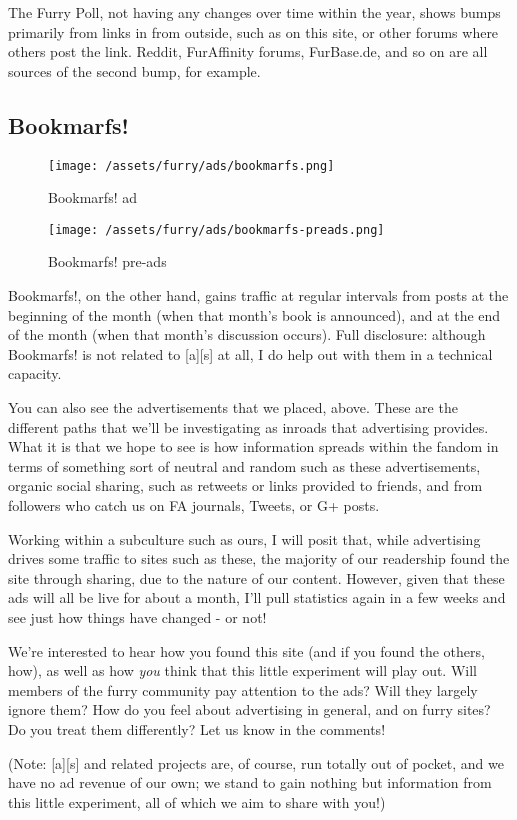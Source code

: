 The Furry Poll, not having any changes over time within the year, shows
bumps primarily from links in from outside, such as on this site, or
other forums where others post the link. Reddit, FurAffinity forums,
FurBase.de, and so on are all sources of the second bump, for example.

\subsection{Bookmarfs!}\label{bookmarfs}

\begin{figure}[htbp]
\centering
\texttt{[image: /assets/furry/ads/bookmarfs.png]}
\caption{Bookmarfs! ad}
\end{figure}

\begin{figure}[htbp]
\centering
\texttt{[image: /assets/furry/ads/bookmarfs-preads.png]}
\caption{Bookmarfs! pre-ads}
\end{figure}

Bookmarfs!, on the other hand, gains traffic at regular intervals from
posts at the beginning of the month (when that month's book is
announced), and at the end of the month (when that month's discussion
occurs). Full disclosure: although Bookmarfs! is not related to
{[}a{]}{[}s{]} at all, I do help out with them in a technical capacity.

You can also see the advertisements that we placed, above. These are the
different paths that we'll be investigating as inroads that advertising
provides. What it is that we hope to see is how information spreads
within the fandom in terms of something sort of neutral and random such
as these advertisements, organic social sharing, such as retweets or
links provided to friends, and from followers who catch us on FA
journals, Tweets, or G+ posts.

Working within a subculture such as ours, I will posit that, while
advertising drives some traffic to sites such as these, the majority of
our readership found the site through sharing, due to the nature of our
content. However, given that these ads will all be live for about a
month, I'll pull statistics again in a few weeks and see just how things
have changed - or not!

We're interested to hear how you found this site (and if you found the
others, how), as well as how \emph{you} think that this little
experiment will play out. Will members of the furry community pay
attention to the ads? Will they largely ignore them? How do you feel
about advertising in general, and on furry sites? Do you treat them
differently? Let us know in the comments!

(Note: {[}a{]}{[}s{]} and related projects are, of course, run totally
out of pocket, and we have no ad revenue of our own; we stand to gain
nothing but information from this little experiment, all of which we aim
to share with you!)
